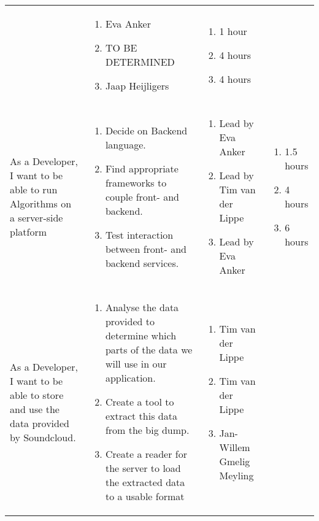 \documentclass[11pt,a4paper]{article}
\begin{document}
\begin{table}[h]
\begin{tabular}{|p{4.5cm}|p{7cm}|p{4cm}|p{2.6cm}|}
& 
\begin{enumerate}
\item Eva Anker
\item TO BE DETERMINED
\item Jaap Heijligers
\end{enumerate}

& 
\begin{enumerate}
\item 1 hour
\item 4 hours
\item 4 hours
\end{enumerate} \\

As a Developer, I want to be able to run Algorithms on a server-side platform & \begin{enumerate}
\item Decide on Backend language.
\item Find appropriate frameworks to couple front- and backend.
\item Test interaction between front- and backend services.
\end{enumerate}

& 
\begin{enumerate}
\item Lead by Eva Anker
\item Lead by Tim van der Lippe
\item Lead by Eva Anker
\end{enumerate}

& 
\begin{enumerate}
\item 1.5 hours
\item 4 hours
\item 6 hours
\end{enumerate} \\

As a Developer, I want to be able to store and use the data provided by Soundcloud. & \begin{enumerate}
\item Analyse the data provided to determine which parts of the data we will use in our application.
\item Create a tool to extract this data from the big dump.
\item Create a reader for the server to load the extracted data to a usable format
\end{enumerate}

& 
\begin{enumerate}
\item Tim van der Lippe
\item Tim van der Lippe
\item Jan-Willem Gmelig Meyling
\end{enumerate}


\end{tabular}
\end{table}
\end{document}

